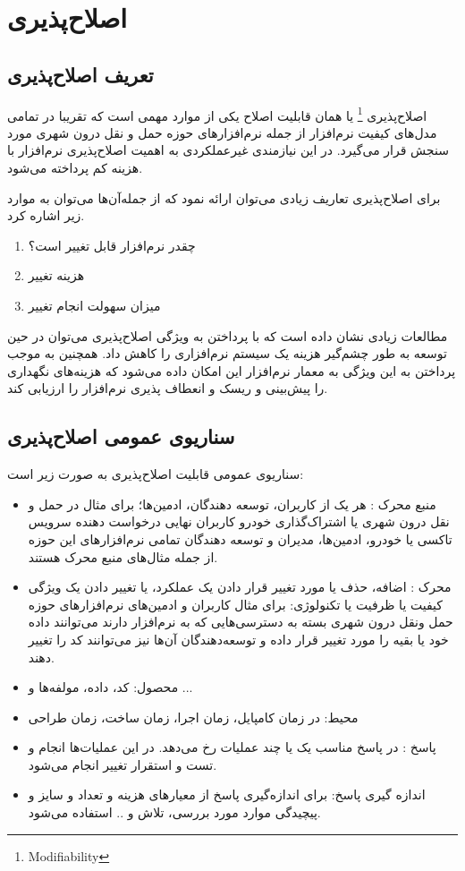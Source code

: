 \chapter{اصلاح‌پذیری}
\section{تعریف اصلاح‌پذیری}
اصلاح‌پذیری
\footnote{Modifiability}
یا همان قابلیت اصلاح یکی از موارد مهمی است که تقریبا در تمامی مدل‌های کیفیت نرم‌افزار از جمله نرم‌افزارهای حوزه حمل و نقل درون شهری مورد سنجش قرار می‌گیرد. در این نیازمندی غیرعملکردی به اهمیت اصلاح‌پذیری نرم‌افزار با هزینه کم پرداخته می‌شود.

برای اصلاح‌پذیری تعاریف زیادی می‌توان ارائه نمود که از جمله‌آن‌ها می‌توان به موارد زیر اشاره کرد.

\begin{enumerate}
\item
چقدر نرم‌افزار قابل تغییر است؟
\item 
هزینه تغییر 
\item
میزان سهولت انجام تغییر
\end{enumerate}

مطالعات زیادی نشان داده است که با پرداختن به ویژگی اصلاح‌پذیری می‌توان در حین توسعه به طور چشم‌گیر هزینه یک سیستم‌ نرم‌افزاری را کاهش داد.
همچنین به موجب پرداختن به این ویژگی به معمار نرم‌افزار این امکان داده می‌شود که هزینه‌های نگهداری را پیش‌بینی و ریسک و انعطاف پذیری نرم‌افزار را ارزیابی کند.

\section{سناریوی عمومی اصلاح‌پذیری}

سناریو‌ی عمومی قابلیت اصلاح‌پذیری به صورت زیر است:
\begin{itemize}
\item
منبع محرک : هر یک از کاربران، توسعه دهندگان، ادمین‌ها؛ برای مثال در حمل و نقل درون شهری یا اشتراک‌گذاری خودرو کاربران نهایی درخواست دهنده سرویس تاکسی یا خودرو، ادمین‌ها، مدیران و توسعه دهندگان تمامی نرم‌افزارهای این حوزه از جمله مثال‌های منبع محرک هستند.
\item
محرک : اضافه، حذف یا مورد تغییر قرار دادن یک عملکرد، یا تغییر دادن یک ویژگی کیفیت یا ظرفیت یا تکنولوژی: برای مثال کاربران و ادمین‌های نرم‌افزارهای حوزه حمل ونقل درون شهری بسته به دسترسی‌هایی که به نرم‌افزار دارند می‌توانند داده خود یا بقیه را مورد تغییر قرار داده و توسعه‌دهندگان آن‌ها نیز می‌توانند کد را تغییر دهند.
\item
محصول:  کد، داده، مولفه‌ها و ...
\item
محیط: در زمان کامپایل، زمان اجرا، زمان ساخت، زمان طراحی
\item
پاسخ : در پاسخ مناسب یک یا چند عملیات رخ می‌دهد. 
در این عملیات‌ها انجام و تست و استقرار تغییر انجام می‌شود.
\item
اندازه گیری پاسخ: برای اندازه‌گیری پاسخ از معیار‌‌های هزینه و تعداد و سایز و پیچیدگی موارد مورد بررسی، تلاش و .. استفاده می‌شود.
\end{itemize}

